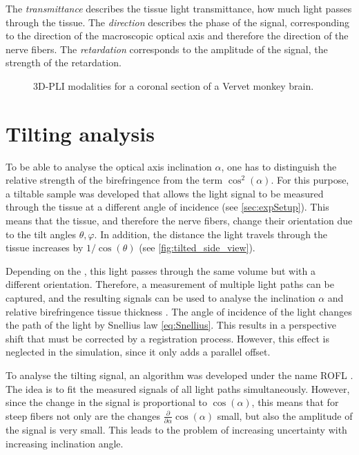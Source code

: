 %
The \textit{transmittance} describes the tissue light transmittance, \ie{} how much light passes through the tissue.
The \textit{direction} describes the phase of the signal, corresponding to the direction of the macroscopic optical axis and therefore the direction of the nerve fibers.
The \textit{retardation} corresponds to the amplitude of the signal, \ie{} the strength of the retardation.
%
\begin{figure}[t]

\caption[3D-PLI modalities]{3D-PLI modalities for a coronal section of a Vervet monkey brain.}
\end{figure}
%
%
\section{Tilting analysis} \label{sec::InclAnalysis}
%
To be able to analyse the optical axis inclination $\alpha$, one has to distinguish the relative strength of the birefringence from the term $\cos^2(\alpha)$.
For this purpose, a tiltable sample was developed that allows the light signal to be measured through the tissue at a different angle of incidence \cite{Axer2011, Wiese:887678} (see \cref{sec:expSetup}).
This means that the tissue, and therefore the nerve fibers, change their orientation due to the tilt angles $\theta, \varphi$.
In addition, the distance the light travels through the tissue increases by $1/\cos(\theta)$ (see \cref{fig:tilted_side_view}).
\par
%
Depending on the \Pixelsize{}, this light passes through the same volume but with a different orientation.
Therefore, a measurement of multiple light paths can be captured, and the resulting signals can be used to analyse the inclination $\alpha$ and relative birefringence tissue thickness \trel{}.
The angle of incidence of the light changes the path of the light by Snellius law \cref{eq:Snellius}.
This results in a perspective shift that must be corrected by a registration process.
However, this effect is neglected in the simulation, since it only adds a parallel offset.
\par
%
To analyse the tilting signal, an algorithm was developed under the name \ac{ROFL} \cite{Wiese:887678,Schmitz2018}.
The idea is to fit the measured signals of all light paths simultaneously.
However, since the change in the signal is proportional to $\cos(\alpha)$, this means that for steep fibers not only are the changes $\frac{\partial}{\partial \alpha} \cos(\alpha)$ small, but also the amplitude of the signal is very small.
This leads to the problem of increasing uncertainty with increasing inclination angle.
